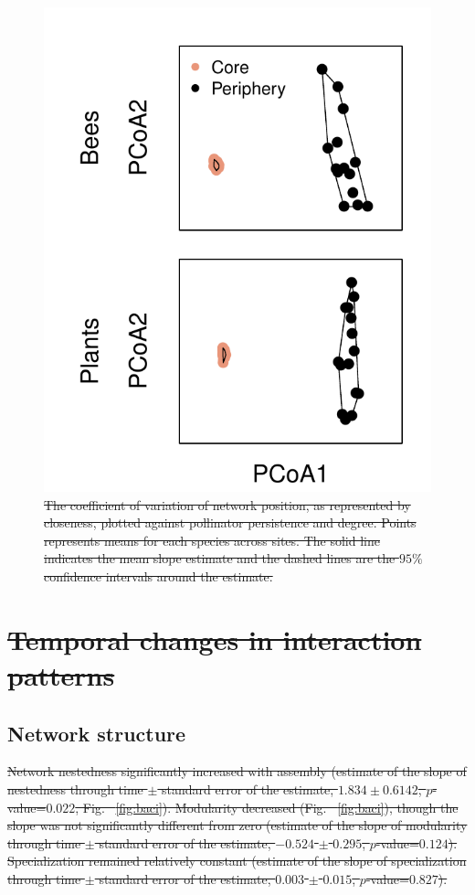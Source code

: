 \documentclass[12pt]{article}
\providecommand{\DIFaddtex}[1]{{\protect\color{blue}\uwave{#1}}} %
\providecommand{\DIFdeltex}[1]{{\protect\color{red}\sout{#1}}}                      %
\providecommand{\DIFdelbegin}{} %
\providecommand{\DIFdelend}{} %
\providecommand{\DIFaddFL}[1]{\DIFadd{#1}} %
\providecommand{\DIFdelFL}[1]{\DIFdel{#1}} %
\providecommand{\DIFaddbeginFL}{} %
\providecommand{\DIFaddendFL}{} %
\providecommand{\DIFdelbeginFL}{} %
\providecommand{\DIFdelendFL}{} %
\providecommand{\DIFadd}[1]{\texorpdfstring{\DIFaddtex{#1}}{#1}} %
\providecommand{\DIFdel}[1]{\texorpdfstring{\DIFdeltex{#1}}{}} %
\begin{document}
\begin{figure}
  \centering
  \DIFdelbeginFL %
\DIFdelendFL \DIFaddbeginFL \includegraphics[width=.7\textwidth]{../analysis/changePoint/plotting/figures/pcoa/pcoa.pdf}
  \DIFaddendFL \caption{\DIFdelbeginFL \DIFdelFL{The coefficient of variation of network position, as
    represented by closeness, plotted against pollinator persistence
    and degree. Points represents means for each species across sites.
    The solid line indicates the mean slope estimate and the dashed
    lines are the $95\%$ confidence intervals around the estimate. }\DIFdelendFL \DIFaddbeginFL \DIFaddFL{XXX}\DIFaddendFL }
  \DIFdelbeginFL %
\DIFdelendFL \DIFaddbeginFL \label{fig:pcoa}
\DIFaddendFL \end{figure}
\clearpage

\DIFdelbegin \section*{\DIFdel{Temporal changes in interaction patterns}}
\DIFdelend \subsection*{Network structure}
\DIFdelbegin \DIFdel{Network nestedness significantly increased with assembly (estimate of
the slope of nestedness through time $\pm$ standard error of the
estimate, $1.834 \pm 0.6142$, $p$-value=$0.022$, Fig.~
\ref{fig:baci}).  Modularity decreased (Fig.~ \ref{fig:baci}), though
the slope was not significantly different from zero (estimate of the
slope of modularity through time $\pm$ standard error of the estimate,
$-0.524$ $\pm$ $0.295$, $p$-value=$0.124$). Specialization remained
relatively constant (estimate of the slope of specialization through time
$\pm$ standard error of the estimate, $0.003$ $\pm$ $0.015$,
$p$-value=$0.827$).
}\DIFdelend 
\end{document}
